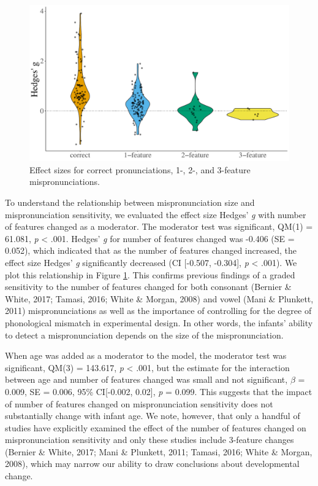 \documentclass[man]{apa6}
\begin{document}
\begin{figure}
\centering
\includegraphics{VonHolzenBergmann_MPMetaAnalysis_files/figure-latex/PlotFeatEffect-1.pdf}
\caption{\label{fig:PlotFeatEffect}Effect sizes for correct pronunciations, 1-, 2-, and 3-feature mispronunciations.}
\end{figure}

To understand the relationship between mispronunciation size and mispronunciation sensitivity, we evaluated the effect size Hedges' \emph{g} with number of features changed as a moderator. The moderator test was significant, QM(1) = 61.081, \emph{p} \textless{} .001. Hedges' \emph{g} for number of features changed was -0.406 (SE = 0.052), which indicated that as the number of features changed increased, the effect size Hedges' \emph{g} significantly decreased (CI {[}-0.507, -0.304{]}, \emph{p} \textless{} .001). We plot this relationship in Figure \ref{fig:PlotFeatEffect}. This confirms previous findings of a graded sensitivity to the number of features changed for both consonant (Bernier \& White, 2017; Tamasi, 2016; White \& Morgan, 2008) and vowel (Mani \& Plunkett, 2011) mispronunciations as well as the importance of controlling for the degree of phonological mismatch in experimental design. In other words, the infants' ability to detect a mispronunciation depends on the size of the mispronunciation.

When age was added as a moderator to the model, the moderator test was significant, QM(3) = 143.617, \emph{p} \textless{} .001, but the estimate for the interaction between age and number of features changed was small and not significant, \(\beta\) = 0.009, SE = 0.006, 95\% CI{[}-0.002, 0.02{]}, \emph{p} = 0.099. This suggests that the impact of number of features changed on mispronunciation sensitivity does not substantially change with infant age. We note, however, that only a handful of studies have explicitly examined the effect of the number of features changed on mispronunciation sensitivity and only these studies include 3-feature changes (Bernier \& White, 2017; Mani \& Plunkett, 2011; Tamasi, 2016; White \& Morgan, 2008), which may narrow our ability to draw conclusions about developmental change.
\end{document}
